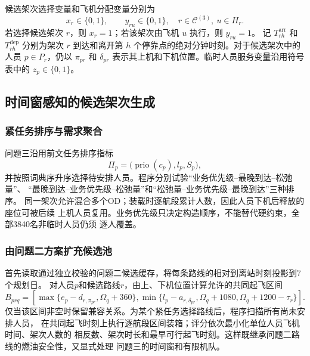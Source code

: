 \documentclass[UTF8,a4paper,zihao=5]{ctexart}
\begin{document}
候选架次选择变量和飞机分配变量分别为
\begin{equation}
  x_r\in\{0,1\},\qquad y_{ru}\in\{0,1\},
  \quad r\in\mathcal{C}^{(3)},\ u\in H_r.
  \label{eq:q3-selection-variables}
\end{equation}
若选择候选架次 $r$，则 $x_r=1$；若该架次由飞机 $u$ 执行，则 $y_{ru}=1$。
记 $T_{rh}^{\mathrm{arr}}$ 和 $T_{rh}^{\mathrm{dep}}$ 分别为架次 $r$ 到达和离开第
$h$ 个停靠点的绝对分钟时刻。对于候选架次中的人员 $p\in P_r$，仍以
$\pi_{pr}$ 和 $\delta_{pr}$ 表示其上机和下机位置。临时人员服务变量沿用符号表中的
$z_p\in\{0,1\}$。

\subsection{时间窗感知的候选架次生成}

\subsubsection{紧任务排序与需求聚合}

问题三沿用前文任务排序指标
\begin{equation}
  \Pi_p=\bigl(\operatorname{prio}(c_p),l_p,S_p\bigr),
  \label{eq:q3-route-priority}
\end{equation}
并按照词典序升序选择待安排人员。程序分别试验“业务优先级--最晚到达--松弛量”、
“最晚到达--业务优先级--松弛量”和“松弛量--业务优先级--最晚到达”三种排序。
同一架次允许混合多个OD；装载时逐航段累计人数，因此人员下机后释放的座位可被后续
上机人员复用。业务优先级只决定构造顺序，不能替代硬约束，全部3840名非临时人员仍须
逐人覆盖。

\subsubsection{由问题二方案扩充候选池}

首先读取通过独立校验的问题二候选缓存，将每条路线的相对到离站时刻投影到7个规划日。
对人员$p$和候选路线$r$，由上、下机位置计算允许的共同起飞区间
\begin{equation}
  B_{prq}=\left[\max\{e_p-d_{r,\pi_{pr}},\Omega_q+360\},
  \min\{l_p-a_{r,\delta_{pr}},\Omega_q+1080,
  \Omega_q+1200-\tau_r\}\right].
  \label{eq:q3-start-interval}
\end{equation}
仅当该区间非空时保留兼容关系。为某个紧任务选择路线后，程序扫描所有尚未安排人员，
在共同起飞时刻上执行逐航段区间装箱；评分依次最小化单位人员飞机时间、架次人数的
相反数、架次时长和最早可行起飞时刻。这样既继承问题二路线的燃油安全性，又显式处理
问题三的时间窗和有限机队。
\end{document}
